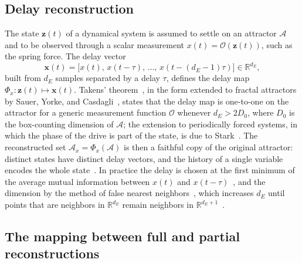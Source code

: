 \subsection{Delay reconstruction}\label{sec:takens}

The state $\mathbf z(t)$ of a dynamical system is assumed to settle on an attractor $\mathcal A$ and to be observed through a scalar measurement $x(t)=\mathcal O(\mathbf z(t))$, such as the spring force. The delay vector
\begin{equation}
\mathbf x(t) = \bigl[x(t),\,x(t-\tau),\,\dots,\,x(t-(d_E-1)\tau)\bigr]\in\mathbb R^{d_E},
\label{eq:delay}
\end{equation}
built from $d_E$ samples separated by a delay $\tau$, defines the delay map $\Phi_x:\mathbf z(t)\mapsto\mathbf x(t)$. Takens' theorem~\cite{Takens1981}, in the form extended to fractal attractors by Sauer, Yorke, and Casdagli~\cite{Sauer1991}, states that the delay map is one-to-one on the attractor for a generic measurement function $\mathcal O$ whenever $d_E>2D_0$, where $D_0$ is the box-counting dimension of $\mathcal A$; the extension to periodically forced systems, in which the phase of the drive is part of the state, is due to Stark~\cite{Stark1999}. The reconstructed set $\mathcal A_x=\Phi_x(\mathcal A)$ is then a faithful copy of the original attractor: distinct states have distinct delay vectors, and the history of a single variable encodes the whole state~\cite{Packard1980,Abarbanel1993}. In practice the delay is chosen at the first minimum of the average mutual information between $x(t)$ and $x(t-\tau)$~\cite{FraserSwinney1986}, and the dimension by the method of false nearest neighbors~\cite{Kennel1992}, which increases $d_E$ until points that are neighbors in $\mathbb R^{d_E}$ remain neighbors in $\mathbb R^{d_E+1}$~\cite{KantzSchreiber2004}.

\subsection{The mapping between full and partial reconstructions}\label{sec:fprm_framework}

